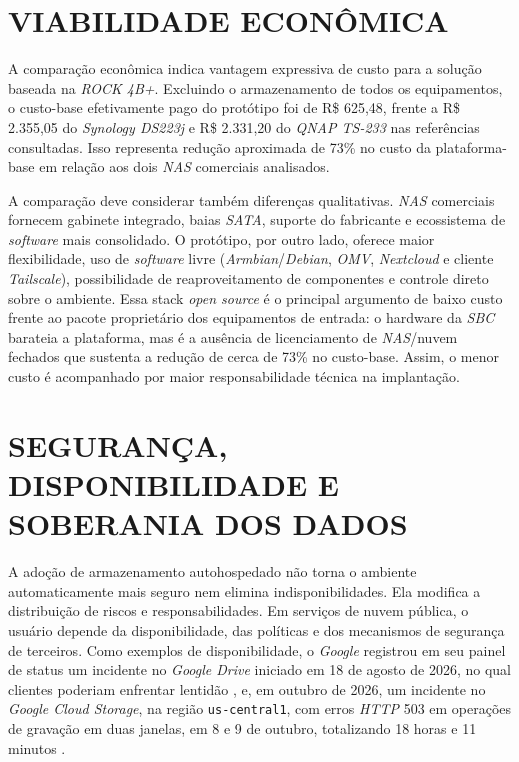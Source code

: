 \section{VIABILIDADE ECONÔMICA}

A comparação econômica indica vantagem expressiva de custo para a solução baseada na \textit{ROCK 4B+}. Excluindo o armazenamento de todos os equipamentos, o custo-base efetivamente pago do protótipo foi de R\$ 625,48, frente a R\$ 2.355,05 do \textit{Synology DS223j} e R\$ 2.331,20 do \textit{QNAP TS-233} nas referências consultadas. Isso representa redução aproximada de 73\% no custo da plataforma-base em relação aos dois \textit{NAS} comerciais analisados.

A comparação deve considerar também diferenças qualitativas. \textit{NAS} comerciais fornecem gabinete integrado, baias \textit{SATA}, suporte do fabricante e ecossistema de \textit{software} mais consolidado. O protótipo, por outro lado, oferece maior flexibilidade, uso de \textit{software} livre (\textit{Armbian}/\textit{Debian}, \textit{OMV}, \textit{Nextcloud} e cliente \textit{Tailscale}), possibilidade de reaproveitamento de componentes e controle direto sobre o ambiente. Essa stack \textit{open source} é o principal argumento de baixo custo frente ao pacote proprietário dos equipamentos de entrada: o hardware da \textit{SBC} barateia a plataforma, mas é a ausência de licenciamento de \textit{NAS}/nuvem fechados que sustenta a redução de cerca de 73\% no custo-base. Assim, o menor custo é acompanhado por maior responsabilidade técnica na implantação.

\section{SEGURANÇA, DISPONIBILIDADE E SOBERANIA DOS DADOS}

A adoção de armazenamento autohospedado não torna o ambiente automaticamente mais seguro nem elimina indisponibilidades. Ela modifica a distribuição de riscos e responsabilidades. Em serviços de nuvem pública, o usuário depende da disponibilidade, das políticas e dos mecanismos de segurança de terceiros. Como exemplos de disponibilidade, o \textit{Google} registrou em seu painel de status um incidente no \textit{Google Drive} iniciado em 18 de agosto de 2026, no qual clientes poderiam enfrentar lentidão \cite{google2026}, e, em outubro de 2026, um incidente no \textit{Google Cloud Storage}, na região \texttt{us-central1}, com erros \textit{HTTP} 503 em operações de gravação em duas janelas, em 8 e 9 de outubro, totalizando 18 horas e 11 minutos \cite{googlecloud2026}.

